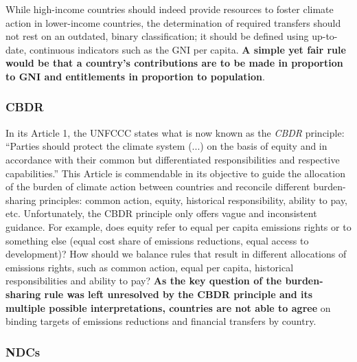 \documentclass[12pt,english]{article}
\begin{document}
While high-income countries should indeed provide resources to foster climate action in lower-income countries, the determination of required transfers should not rest on an outdated, binary classification; it should be defined using up-to-date, continuous indicators such as the GNI per capita. \textbf{A simple yet fair rule would be that a country's contributions are to be made in proportion to GNI and entitlements in proportion to population}. 

\subsubsection{CBDR\label{subsubsec:cbdr}} 
In its Article 1, the UNFCCC states what is now known as the \textit{CBDR} principle: ``Parties should protect the climate system (...) on the basis of equity and in accordance with their common but differentiated responsibilities and respective capabilities.'' This Article is commendable in its objective to guide the allocation of the burden of climate action between countries and reconcile different burden-sharing principles: common action, equity, historical responsibility, ability to pay, etc. Unfortunately, the CBDR principle only offers vague and inconsistent guidance. For example, does equity refer to equal per capita emissions rights or to something else (equal cost share of emissions reductions, equal access to development)? How should we balance rules that result in different allocations of emissions rights, such as common action, equal per capita, historical responsibilities and ability to pay? \textbf{As the key question of the burden-sharing rule was left unresolved by the CBDR principle and its multiple possible interpretations, countries are not able to agree} on binding targets of emissions reductions and financial transfers by country. 

\subsubsection{NDCs\label{subsubsec:ndc}} 
\end{document}
